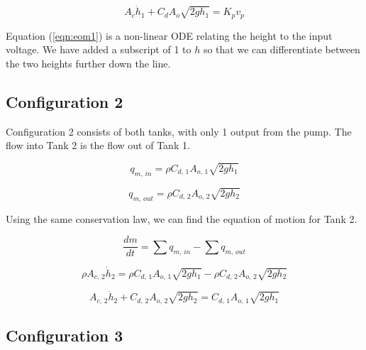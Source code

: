 \documentclass[12pt]{article}
\numberwithin{equation}{subsection}
\begin{document}
  \begin{equation} \label{eqn:eom1}
    A_c \dot h_1 +  C_d A_o \sqrt{2gh_1} = K_p v_p
  \end{equation}

  Equation (\ref{eqn:eom1}) is a non-linear ODE relating the height to the input voltage. We have added a subscript of 1 to $ h $ so that we can differentiate between the two heights further down the line.

  \subsection{Configuration 2}

  Configuration 2 consists of both tanks, with only 1 output from the pump. The flow into Tank 2 is the flow out of Tank 1.

  \begin{equation}
    q_{m, \, in} = \rho C_{d, \, 1} A_{o, \, 1}  \sqrt{2gh_1}
  \end{equation}

  \begin{equation}
    q_{m, \, out} = \rho C_{d, \, 2} A_{o, \, 2}  \sqrt{2gh_2}
  \end{equation}

  Using the same conservation law, we can find the equation of motion for Tank 2.

  \begin{equation}
    \frac{dm}{dt} = \sum q_{m, \, in} - \sum q_{m ,\, out}
  \end{equation}

  \begin{equation}
    \rho A_{c, \, 2} \dot h_2 = \rho C_{d, \, 1} A_{o, \, 1}  \sqrt{2gh_1} - \rho C_{d, \, 2} A_{o, \, 2}  \sqrt{2gh_2}
  \end{equation}

  \begin{equation} \label{eqn:eom2}
    A_{c, \, 2} \dot h_2 + C_{d, \, 2} A_{o, \, 2}  \sqrt{2gh_2} = C_{d, \, 1} A_{o, \, 1}  \sqrt{2gh_1}
  \end{equation}





  \subsection{Configuration 3}
\end{document}

